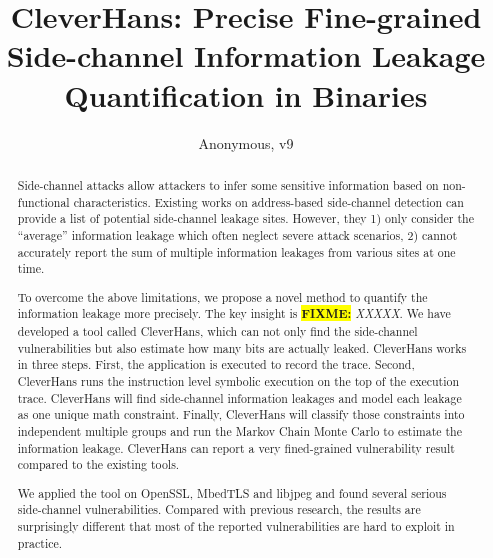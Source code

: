\documentclass[conference]{IEEEtran}
\newcommand{\highlight}[1]{\colorbox{yellow}{\textbf{#1}}}
\newcommand{\fixme}[1]{\highlight{FIXME:} \emph{#1}}
\newcommand{\tool}{TANA}
\renewcommand{\tool}{CleverHans}
\begin{document}
\title{\tool{}: Precise Fine-grained Side-channel Information Leakage Quantification in Binaries}
\author{Anonymous, v9}

\maketitle

\begin{abstract}
    Side-channel attacks allow attackers to infer some sensitive 
    information based on non-functional characteristics. 
    Existing works on address-based side-channel detection 
    can provide a list of potential side-channel leakage sites. However, they 
    1) only consider the ``average'' information leakage 
    which often neglect severe attack scenarios,
    2) cannot accurately report
    the sum of multiple information leakages from various sites at one time.
       
    To overcome the above limitations, we propose a novel method
    to quantify the information leakage more precisely.  
    The key insight is \fixme{XXXXX}.
    We have developed a tool called \tool{}, which can not only 
    find the side-channel vulnerabilities but also estimate how many bits are actually leaked. 
    \tool{} works in three steps. First, the application is executed to record the 
    trace. Second, \tool{} runs the instruction level symbolic execution on the top of the 
    execution trace. \tool{} will find side-channel information leakages and model each leakage 
    as one unique math constraint. Finally, \tool{} will classify those constraints into 
    independent multiple groups and run the Markov Chain Monte Carlo to estimate the 
    information leakage. \tool{} can report a very fined-grained vulnerability result 
    compared to the existing tools.
    
    We applied the tool on OpenSSL, MbedTLS and libjpeg and found several serious side-channel 
    vulnerabilities. Compared with previous research, the results are surprisingly different 
    that most of the reported vulnerabilities are hard to exploit in practice. 

\end{abstract}

\IEEEpeerreviewmaketitle
{}














\end{document}
